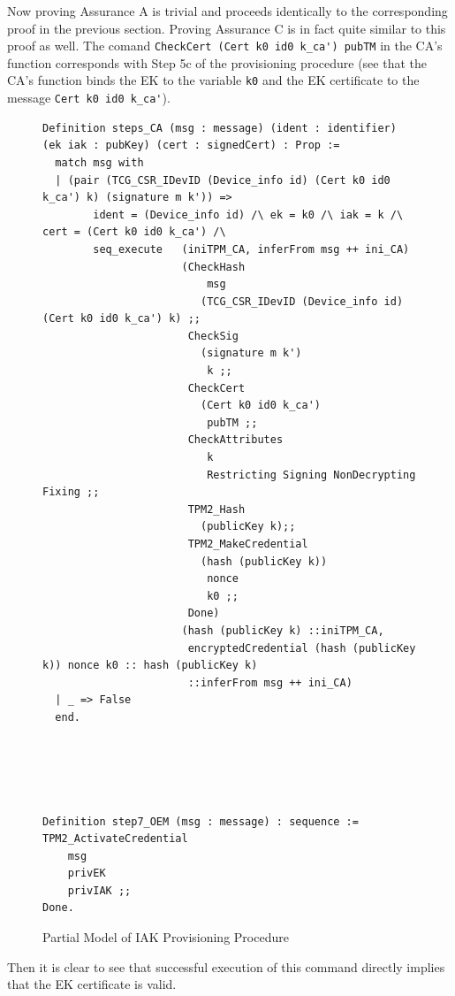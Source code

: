 \documentclass[runningheads]{llncs}
\begin{document}
Now proving Assurance A is trivial and proceeds identically to the corresponding proof in the previous section.
Proving Assurance C is in fact quite similar to this proof as well. The comand \verb|CheckCert (Cert k0 id0 k_ca') pubTM| in the CA's function corresponds with Step 5c of the provisioning procedure (see that the CA's function binds the EK to the variable \verb|k0| and the EK certificate to the message \verb|Cert k0 id0 k_ca'|). 
\vspace{2em}
\begin{figure}[h!]
\begin{lstlisting}[language=Coq]
Definition steps_CA (msg : message) (ident : identifier) (ek iak : pubKey) (cert : signedCert) : Prop :=
  match msg with
  | (pair (TCG_CSR_IDevID (Device_info id) (Cert k0 id0 k_ca') k) (signature m k')) =>
        ident = (Device_info id) /\ ek = k0 /\ iak = k /\ cert = (Cert k0 id0 k_ca') /\
        seq_execute   (iniTPM_CA, inferFrom msg ++ ini_CA)
                      (CheckHash 
                          msg 
                         (TCG_CSR_IDevID (Device_info id) (Cert k0 id0 k_ca') k) ;;
                       CheckSig 
                         (signature m k') 
                          k ;;
                       CheckCert 
                         (Cert k0 id0 k_ca') 
                          pubTM ;;
                       CheckAttributes 
                          k 
                          Restricting Signing NonDecrypting Fixing ;;
                       TPM2_Hash 
                         (publicKey k);;
                       TPM2_MakeCredential 
                         (hash (publicKey k))
                          nonce
                          k0 ;;
                       Done)
                      (hash (publicKey k) ::iniTPM_CA, 
                       encryptedCredential (hash (publicKey k)) nonce k0 :: hash (publicKey k) 
                       ::inferFrom msg ++ ini_CA)
  | _ => False
  end.





Definition step7_OEM (msg : message) : sequence :=
TPM2_ActivateCredential 
    msg 
    privEK 
    privIAK ;;
Done.
\end{lstlisting}
\caption{Partial Model of IAK Provisioning Procedure}
\label{fig:iak_model}
\end{figure}
\vspace{4em}
Then it is clear to see that successful execution of this command directly implies that the EK certificate is valid.
\end{document}
